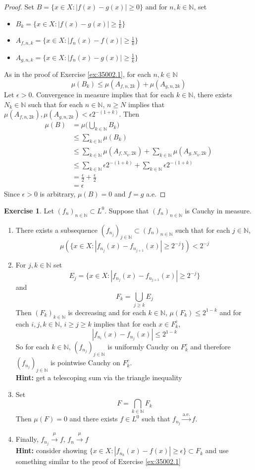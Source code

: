 \documentclass{book}
\theoremstyle{definition}
\newtheorem{ex}[definition]{Exercise}
\newcommand{\ep}{\epsilon}
\newcommand{\N}{\mathbb{N}}
\newcommand{\lex}[1]{\label{ex:#1}}
\newcommand{\rex}[1]{Exercise \ref{ex:#1}}
\DeclareMathOperator*{\0}{\mbf{0}}
\DeclareMathOperator*{\1}{\mbf{1}}
\newcommand{\convt}[1]{\xrightarrow{\text{#1}}}
\newcommand{\conv}[1]{\xrightarrow{#1}}
\begin{document}
	\begin{proof}
	Set $B = \{x \in X: |f(x) - g(x)|  \geq 0\}$ and for $n, k \in \N$, set 
	\begin{itemize}
	\item $B_k = \{x \in X: |f(x) - g(x)| \geq  \frac{1}{k}\}$
	\item $A_{f,n,k} = \{x \in X: |f_n(x) - f(x)| \geq  \frac{1}{k}\}$
	\item $A_{g,n,k} = \{x \in X: |f_n(x) - g(x)| \geq  \frac{1}{k}\}$
	\end{itemize} 
	As in the proof of \rex{35002.1}, for each $n, k \in \N$
	$$\mu(B_k) \leq \mu(A_{f,n,2k}) + \mu(A_{g, n, 2k})$$ 
	Let $\ep >0$. Convergence in measure implies that for each $k \in \N$, there exists $N_k \in \N$ such that for each $n \in \N$, $n \geq N$ implies that $\mu(A_{f,n,2k}), \mu(A_{g,n,2k}) < \ep 2^{-(1+k)}$.
	Then 
	\begin{align*}
	\mu(B)
	&= \mu \bigg( \bigcup_{k \in \N} B_k \bigg) \\
	& \leq \sum_{k \in \N} \mu(B_k) \\
	& \leq  \sum_{k \in \N}\mu(A_{f,N_k,2k}) + \sum_{k \in \N}\mu(A_{g, N_k, 2k}) \\
	&\leq  \sum_{k \in \N} \ep 2^{-(1+k)} + \sum_{k \in \N} \ep 2^{-(1+k)} \\
	&= \frac{\ep}{2} + \frac{\ep}{2} \\
	&= \ep
\end{align*}	 
	Since $\ep >0$ is arbitrary, $\mu(B) = 0$ and $f = g$ a.e.
	\end{proof}
	
	\begin{ex} \lex{35003} 
		Let $(f_n)_{n \in \N} \subset L^0$. Suppose that $(f_n)_{n \in \N}$ is Cauchy in measure. 
		\begin{enumerate}
		\item There exists a subsequence $(f_{n_j})_{j \in \N} \subset (f_n)_{n \in \N}$ such that for each $j \in \N$, $$\mu(\{x \in X: |f_{n_j}(x) - f_{n_{j+1}}(x)| \geq 2^{-j}\}) < 2^{-j}$$
		\item For $j,k \in \N$ set 
		$$E_j = \{x \in X: |f_{n_j}(x) - f_{n_{j+1}}(x)| \geq 2^{-j}\}$$
		and 
		$$F_k = \bigcup_{j \geq k}E_j$$
		Then $(F_k)_{k \in \N}$ is decreasing and for each $k \in \N$, $\mu(F_k) \leq 2^{1-k}$ and for each $i, j, k \in \N$, $i \geq j \geq k$ implies that for each $x \in F_k^c$, $$|f_{n_i}(x) - f_{n_j}(x)| \leq 2^{1-k}$$ 
		So for each $k \in \N$, $(f_{n_j})_{j \in \N}$  is uniformly Cauchy on $F_k^c$ and therefore $(f_{n_j})_{j \in \N}$  is pointwise Cauchy on $F_k^c$. \\
		\textbf{Hint:} get a telescoping sum via the triangle inequality 
		\item Set $$F = \bigcap_{k \in \N} F_k$$ 
		Then $\mu(F) = 0$ and there exists $f \in L^0$ such that $f_{n_j} \convt{a.e.} f$.  
		\item Finally, $f_{n_j} \conv{\mu} f$, $f_n \conv{\mu} f$ \\
		\textbf{Hint:} consider showing $\{x \in X: |f_{n_k}(x) - f(x)| \geq \ep\} \subset F_k$ and use something similar to the proof of \rex{35002.1}
		\end{enumerate}  
	\end{ex}
	
\end{document}
